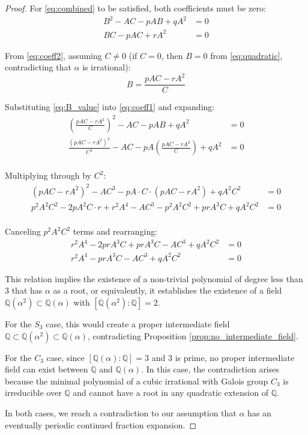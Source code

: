 \begin{proof}
For \eqref{eq:combined} to be satisfied, both coefficients must be zero:
\begin{align}
B^2 - AC - pAB + qA^2 &= 0 \label{eq:coeff1}\\
BC - pAC + rA^2 &= 0 \label{eq:coeff2}
\end{align}

From \eqref{eq:coeff2}, assuming $C \neq 0$ (if $C = 0$, then $B = 0$ from \eqref{eq:quadratic}, contradicting that $\alpha$ is irrational):
\begin{equation}\label{eq:B_value}
B = \frac{pAC - rA^2}{C}
\end{equation}

Substituting \eqref{eq:B_value} into \eqref{eq:coeff1} and expanding:
\begin{align}
\left(\frac{pAC - rA^2}{C}\right)^2 - AC - pAB + qA^2 &= 0 \\
\frac{(pAC - rA^2)^2}{C^2} - AC - pA\left(\frac{pAC - rA^2}{C}\right) + qA^2 &= 0 \\
\end{align}

Multiplying through by $C^2$:
\begin{align}
(pAC - rA^2)^2 - AC^3 - pA \cdot C \cdot (pAC - rA^2) + qA^2C^2 &= 0 \\
p^2A^2C^2 - 2pA^2C \cdot r + r^2A^4 - AC^3 - p^2A^2C^2 + prA^3C + qA^2C^2 &= 0 \\
\end{align}

Canceling $p^2A^2C^2$ terms and rearranging:
\begin{align}
r^2A^4 - 2prA^3C + prA^3C - AC^3 + qA^2C^2 &= 0 \\
r^2A^4 - prA^3C - AC^3 + qA^2C^2 &= 0 
\end{align}

This relation implies the existence of a non-trivial polynomial of degree less than 3 that has $\alpha$ as a root, or equivalently, it establishes the existence of a field $\mathbb{Q}(\alpha^2) \subset \mathbb{Q}(\alpha)$ with $[\mathbb{Q}(\alpha^2):\mathbb{Q}] = 2$.

For the $S_3$ case, this would create a proper intermediate field $\mathbb{Q} \subset \mathbb{Q}(\alpha^2) \subset \mathbb{Q}(\alpha)$, contradicting Proposition \ref{prop:no_intermediate_field}.

For the $C_3$ case, since $[\mathbb{Q}(\alpha):\mathbb{Q}] = 3$ and 3 is prime, no proper intermediate field can exist between $\mathbb{Q}$ and $\mathbb{Q}(\alpha)$. In this case, the contradiction arises because the minimal polynomial of a cubic irrational with Galois group $C_3$ is irreducible over $\mathbb{Q}$ and cannot have a root in any quadratic extension of $\mathbb{Q}$.

In both cases, we reach a contradiction to our assumption that $\alpha$ has an eventually periodic continued fraction expansion.
\end{proof}

